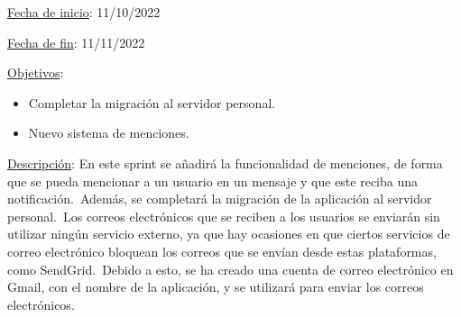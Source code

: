 
\underline{Fecha de inicio}: 11/10/2022

\underline{Fecha de fin}: 11/11/2022

\underline{Objetivos}:
\begin{itemize}
	\item Completar la migración al servidor personal.
	\item Nuevo sistema de menciones.
\end{itemize}

\underline{Descripción}:
En este sprint se añadirá la funcionalidad de menciones, de forma que se pueda mencionar a un usuario en un
mensaje y que este reciba una notificación.\ Además, se completará la migración de la aplicación al servidor
personal.\ Los correos electrónicos que se reciben a los usuarios se enviarán sin utilizar ningún servicio externo,
ya que hay ocasiones en que ciertos servicios de correo electrónico bloquean los correos que se envían desde
estas plataformas, como SendGrid.\ Debido a esto, se ha creado una cuenta de correo electrónico en Gmail, con el nombre
de la aplicación, y se utilizará para enviar los correos electrónicos.
